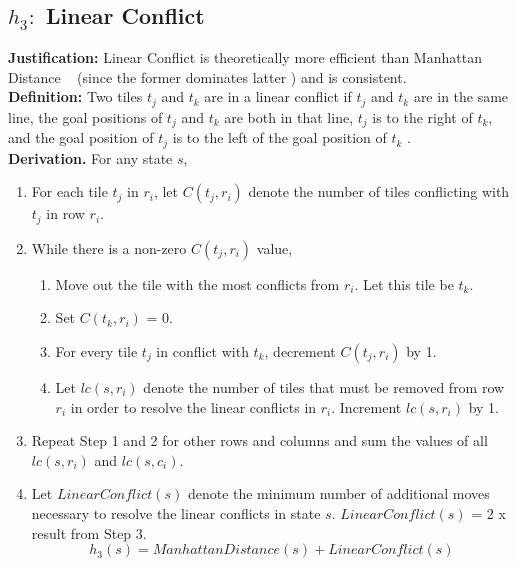\documentclass[runningheads]{llncs}
\begin{document}
\subsection{ \(h_3: \) Linear Conflict}
\textbf{Justification:} Linear Conflict is theoretically more efficient than Manhattan Distance ~\cite[p104]{stuart_russell_artifical_2010} (since the former dominates latter \cite[p25]{othar_hansson_generating_1985}) and is consistent. \\
\textbf{Definition:} Two tiles \( t_j \) and \( t_k \) are in a linear conflict if \( t_j \) and \( t_k \) are in the same line, 
the goal positions of \( t_j \) and \( t_k \) are both in that line, 
\( t_j \) is to the right of \( t_k \), and the goal position of \( t_j \) is to the left of the goal position of \( t_k \) \cite[p13]{othar_hansson_generating_1985}. \\
\textbf{Derivation.} For any state \( s \),
\begin{enumerate}
    \item For each tile \( t_j \) in \( r_i \), let \( C(t_j, r_i) \) denote the number of tiles conflicting with \( t_j \) in row \( r_i \).
    \item While there is a non-zero \( C(t_j, r_i) \) value, 
    \begin{enumerate}
        \item Move out the tile with the most conflicts from \( r_i \). Let this tile be \( t_k \).
        \item Set \( C(t_k, r_i) \) = 0.
        \item For every tile \( t_j \) in conflict with \( t_k \), decrement \( C(t_j, r_i) \) by 1.
        \item Let \( lc(s, r_i) \) denote the number of tiles that must be removed from row \( r_i \) in order to resolve the linear conflicts in \( r_i \). Increment \( lc(s, r_i) \) by 1.
    \end{enumerate}
    \item Repeat Step 1 and 2 for other rows and columns and sum the values of all \( lc (s, r_i) \) and \( lc(s, c_i) \).
    \item Let \( LinearConflict(s) \) denote the minimum number of additional moves necessary to resolve the linear conflicts in state \( s \). \( LinearConflict(s) \) = 2 x result from Step 3.
    \[
        h_3(s) = ManhattanDistance(s) + LinearConflict(s)
    \]
\end{enumerate}
\end{document}

